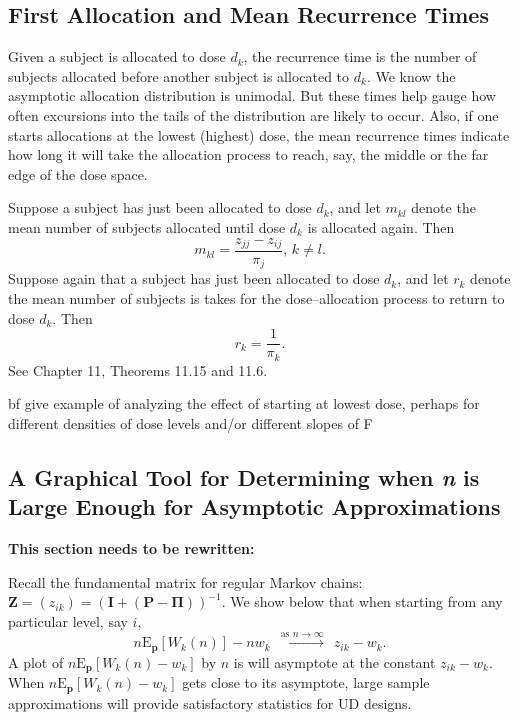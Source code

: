 \subsection{First Allocation and Mean Recurrence Times}
Given a subject is allocated to dose  $d_k$, the recurrence time  is the number of subjects allocated before another subject is allocated to $d_k$.  We know the asymptotic allocation distribution is unimodal.  But these times help gauge how often excursions into the tails of the distribution are likely to occur.   Also, if one starts allocations at the lowest (highest) dose, the mean recurrence times indicate how long it will take the allocation process to reach, say, the middle or the far edge of the dose space.

Suppose a subject has just been allocated to dose $d_k$, and let  $m_{kl}$ denote the mean number of subjects allocated until dose $d_k$ is allocated again.
Then $$m_{kl}=\frac{z_{jj}-z_{ij}}{\pi_j},\, k\ne l.$$
Suppose again that a subject has just been allocated to dose $d_k$, and let $r_k$ denote the mean number of subjects is takes for the dose--allocation process to return to dose $d_k$.  Then $$r_k=\frac{1}{\pi_k}. $$
{See Chapter 11, Theorems 11.15 and 11.6}\cite{Grin:Snel:Intr:1997}.

{bf give example of analyzing the effect of starting at lowest dose, perhaps for different densities of dose levels and/or different slopes of F}

\subsection{ A Graphical Tool for Determining when {\em n} is Large Enough for Asymptotic Approximations}
{\bf This section needs to be rewritten:}

Recall the fundamental matrix for regular Markov chains:
 $\mathbf{Z}=\left(z_{ik}\right)=\left({\mathbf{I}}+\left({\mathbf{P}}
 -\boldsymbol{\Pi}\right)\right)^{-1}$.
  We show below that
when starting from any particular level, say $i$,
$$n\mathrm{E}_{\mathbf{p}}\left[W_k(n)\right]-nw_k \ \ \stackrel{\textrm{as } n
\rightarrow \infty}\longrightarrow\ \ z_{ik}-w_k. $$
A plot of $n\mathrm{E}_{\mathbf{p}}\left[W_k(n)-w_k\right]$ by $n$ is will asymptote at
the constant $z_{ik}-w_k$. When $n\mathrm{E}_{\mathbf{p}}\left[W_k(n)-w_k\right]$  gets close to its asymptote, large sample approximations will
provide satisfactory statistics for UD designs.

